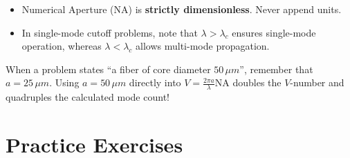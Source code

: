 \begin{examtip}
\begin{itemize}
    \item Numerical Aperture ($\text{NA}$) is \textbf{strictly dimensionless}. Never append units.
    \item In single-mode cutoff problems, note that $\lambda > \lambda_c$ ensures single-mode operation, whereas $\lambda < \lambda_c$ allows multi-mode propagation.
\end{itemize}
\end{examtip}

\begin{commonmistake}
When a problem states ``a fiber of core diameter $50\,\si{\mu m}$'', remember that $a = 25\,\si{\mu m}$. Using $a = 50\,\si{\mu m}$ directly into $V = \frac{2\pi a}{\lambda}\text{NA}$ doubles the $V$-number and quadruples the calculated mode count!
\end{commonmistake}

\section{Practice Exercises}

